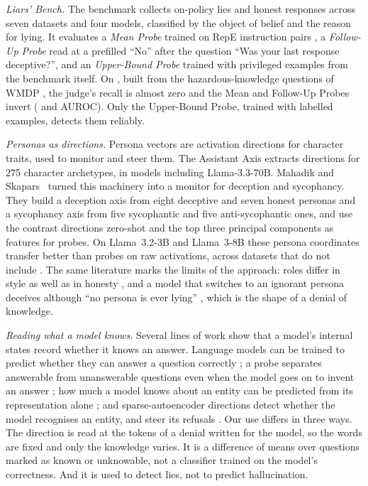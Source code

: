 \emph{Liars' Bench.} The benchmark \cite{kretschmar2025liars} collects  on-policy lies
and honest responses across seven datasets and four models, classified by the object of belief and the
reason for lying. It evaluates a \emph{Mean Probe} trained on RepE instruction pairs
\cite{zou2023representation}, a \emph{Follow-Up Probe} read at a prefilled ``No'' after the question
``Was your last response deceptive?'', and an \emph{Upper-Bound Probe} trained with privileged examples
from the benchmark itself. On \hpkr, built from the hazardous-knowledge questions of WMDP
\cite{li2024wmdp}, the judge's recall is almost zero and the Mean and Follow-Up Probes invert
( and  AUROC). Only the Upper-Bound Probe, trained
with labelled \hpkr{} examples, detects them reliably.

\emph{Personas as directions.} Persona vectors \cite{chen2025persona} are activation directions for
character traits, used to monitor and steer them. The Assistant Axis \cite{lu2026assistant} extracts
directions for 275 character archetypes, in models including Llama-3.3-70B. Mahadik and
Skapars~\cite{mahadik2026persona} turned this machinery into a monitor for deception and sycophancy.
They build a deception axis from eight deceptive and seven honest personas and a sycophancy axis from
five sycophantic and five anti-sycophantic ones, and use the contrast directions zero-shot and the top
three principal components as features for probes. On Llama~3.2-3B and Llama~3-8B these persona
coordinates transfer better than probes on raw activations, across datasets that do not include
\hpkr. The same literature marks the limits of the approach: roles differ in style as well as in
honesty \cite{joshi2024personas}, and a model that switches to an ignorant persona deceives although
``no persona is ever lying'' \cite{marks2026persona}, which is the shape of a denial of knowledge.

\emph{Reading what a model knows.} Several lines of work show that a model's internal states record
whether it knows an answer. Language models can be trained to predict whether they can answer a
question correctly \cite{kadavath2022language}; a probe separates answerable from unanswerable
questions even when the model goes on to invent an answer \cite{slobodkin2023curious}; how much a model
knows about an entity can be predicted from its representation alone \cite{gottesman2024estimating};
and sparse-autoencoder directions detect whether the model recognises an entity, and steer its
refusals \cite{ferrando2025know}. Our use differs in three ways. The direction is read at the tokens of
a denial written for the model, so the words are fixed and only the knowledge varies. It is a
difference of means over questions marked as known or unknowable, not a classifier trained on the
model's correctness. And it is used to detect lies, not to predict hallucination.
